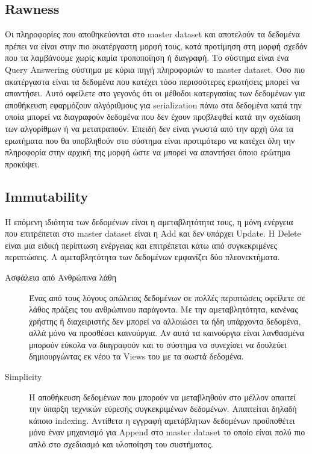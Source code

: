 \subsection{Rawness}
Οι πληροφορίες που αποθηκεύονται στο master dataset και αποτελούν τα δεδομένα πρέπει να 	είναι στην πιο ακατέργαστη μορφή τους, κατά προτίμηση στη μορφή σχεδόν που τα λαμβάνουμε χωρίς καμία τροποποίηση ή διαγραφή. Το σύστημα είναι ένα Query Answering σύστημα με κύρια πηγή πληροφοριών το master dataset. Όσο πιο ακατέργαστα είναι τα δεδομένα που κατέχει τόσο περισσότερες ερωτήσεις μπορεί να απαντήσει. Αυτό οφείλετε στο γεγονός ότι οι μέθοδοι κατεργασίας των δεδομένων για αποθήκευση εφαρμόζουν αλγόριθμους για serialization πάνω στα δεδομένα κατά την οποία μπορεί να διαγραφούν δεδομένα που δεν έχουν προβλεφθεί κατά την σχεδίαση των αλγορίθμων ή να μετατραπούν. Επειδή δεν είναι γνωστά από την αρχή όλα τα ερωτήματα που θα υποβληθούν στο σύστημα είναι προτιμότερο να κατέχει όλη την πληροφορία στην αρχική της μορφή ώστε να μπορεί να απαντήσει όποιο ερώτημα προκύψει.
\newline

\subsection{Immutability}
Η επόμενη ιδιότητα των δεδομένων είναι η αμεταβλητότητα τους, η μόνη ενέργεια που επιτρέπεται στο master dataset είναι η Add και δεν υπάρχει Update. Η Delete είναι μια ειδική περίπτωση ενέργειας και επιτρέπεται κάτω από συγκεκριμένες περιπτώσεις. Α αμεταβλητότητα των δεδομένων εμφανίζει δύο πλεονεκτήματα.
\begin{description}
\item [Ασφάλεια από Ανθρώπινα λάθη] Ένας από τους λόγους απώλειας δεδομένων σε πολλές περιπτώσεις οφείλετε σε λάθος πράξεις του ανθρώπινου παράγοντα. Με την αμεταβλητότητα, κανένας χρήστης ή διαχειριστής δεν μπορεί να αλλοιώσει τα ήδη υπάρχοντα δεδομένα, αλλά μόνο να προσθέσει καινούργια. Αν αυτά τα καινούργια είναι λανθασμένα μπορούν εύκολα να διαγραφούν και το σύστημα να συνεχίσει να δουλεύει δημιουργώντας εκ νέου τα Views του με τα σωστά δεδομένα.
\item [Simplicity] Η αποθήκευση δεδομένων που μπορούν να μεταβληθούν στο μέλλον απαιτεί την ύπαρξη τεχνικών εύρεσής συγκεκριμένων δεδομένων. Απαιτείται δηλαδή κάποιο indexing. Αντίθετα η εγγραφή αμετάβλητων δεδομένων προϋποθέτει μόνο έναν μηχανισμό για Append στο master dataset το οποίο είναι πολύ πιο απλό στο σχεδιασμό και υλοποίηση του συστήματος.
\end{description}

